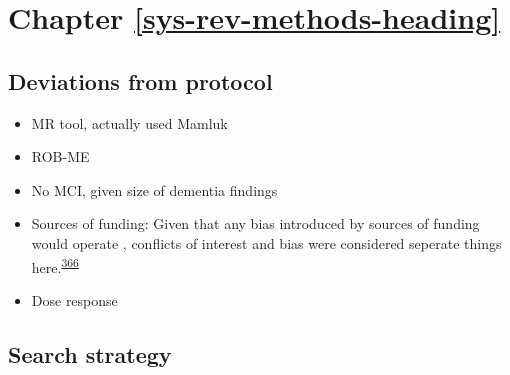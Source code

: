 \documentclass[a4paper, twoside]{templates/ociamthesis}
\begin{document}
\hypertarget{appendix-sys-rev}{%
\section{Chapter \ref{sys-rev-methods-heading}}\label{appendix-sys-rev}}

\hypertarget{deviations-from-protocol}{%
\subsection{Deviations from protocol}\label{deviations-from-protocol}}

\begin{itemize}
\item
  MR tool, actually used Mamluk
\item
  ROB-ME
\item
  No MCI, given size of dementia findings
\item
  Sources of funding: Given that any bias introduced by sources of funding would operate , conflicts of interest and bias were considered seperate things here.\textsuperscript{\protect\hyperlink{ref-sterne2013}{366}}
\item
  Dose response
\end{itemize}

\hypertarget{appendix-search-strategy}{%
\subsection{Search strategy}\label{appendix-search-strategy}}

~
\end{document}
